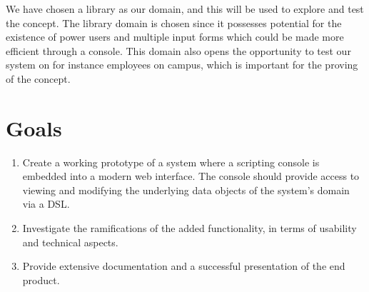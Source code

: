 We have chosen a library as our domain, and this will be used to explore and test the concept. The library domain is chosen since it possesses potential for the existence of power users and multiple input forms which could be made more efficient through a console. This domain also opens the opportunity to test our system on for instance employees on campus, which is important for the proving of the concept.


\section{Goals}
\begin{enumerate}
  \item Create a working prototype of a system where a scripting console is embedded into a modern web interface. The console should provide access to viewing and modifying the underlying data objects of the system's domain via a DSL.
  \item Investigate the ramifications of the added functionality, in terms of usability and technical aspects.
  \item Provide extensive documentation and a successful presentation of the end product.
\end{enumerate}

